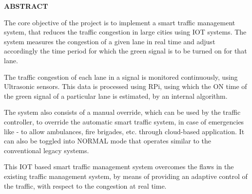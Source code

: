 \newpage
\begin{center}
\thispagestyle{empty}
\vspace*{2\baselineskip}
\LARGE{\textbf{ABSTRACT}}\\[0.5cm]
\end{center}
\thispagestyle{empty}
\doublespacing
\begin{normalsize}
The core objective of the project is to implement a smart traffic management system, that reduces the traffic congestion in large cities using IOT systems. The system measures the congestion of a given lane in real time and adjust accordingly the time period for which the green signal is to be turned on for that lane.

The traffic congestion of each lane in a signal is monitored continuously, using Ultrasonic sensors. This data is processed using RPi, using which the ON time of the green signal of a particular lane is estimated, by an internal algorithm.

The system also consists of a manual override, which can be used by the traffic controller, to override the automatic smart traffic system, in case of emergencies like - to allow ambulances, fire brigades, etc. through cloud-based application. It can also be toggled into NORMAL mode that operates similar to the conventional legacy systems.

This IOT based smart traffic management system overcomes the flaws in the existing traffic management system, by means of providing an adaptive control of the traffic, with respect to the congestion at real time.
\\[1cm]
\end{normalsize}
